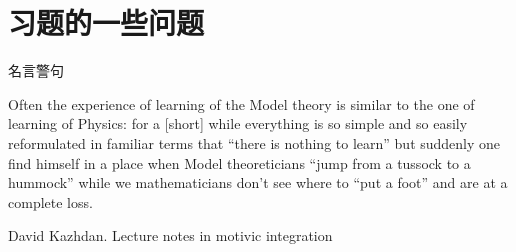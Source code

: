 \documentclass[presentation]{beamer}
\begin{document}
\section{习题的一些问题}
\label{sec:org6cd751d}
\begin{frame}[label={sec:org306206c}]{名言警句}
    \begin{displayquote}
Often the experience of learning of the Model theory is similar to the one of learning of Physics: for a [short] while everything is so simple and so easily reformulated in familiar terms that “there is nothing to learn” but suddenly one find himself in a place when Model theoreticians “jump from a tussock to a hummock” while we mathematicians don't see where to “put a foot” and are at a complete loss.\par
\hfill David Kazhdan. Lecture notes in motivic integration
    \end{displayquote}
\end{frame}
\end{document}

